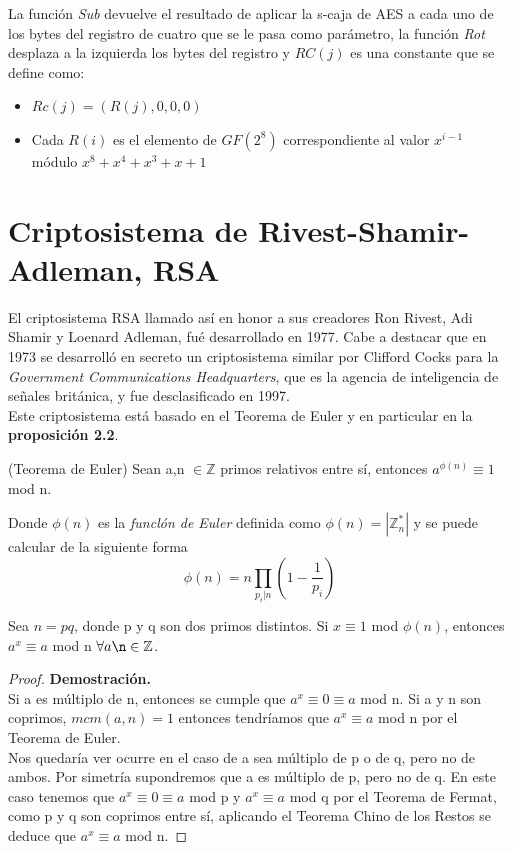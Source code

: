 La función \emph{Sub} devuelve el resultado de aplicar la s-caja de AES a cada uno de los bytes del registro de cuatro que se le pasa como parámetro, la función \emph{Rot} desplaza a la izquierda los bytes del registro y $RC(j)$ es una constante que se define como:
\begin{itemize}
	\item $Rc(j)=(R(j),0,0,0)$
	\item Cada $R(i)$ es el elemento de $GF(2^8)$ correspondiente al valor $x^{i-1}$ módulo $x^8+x^4+x^3+x+1$
\end{itemize}

\section{Criptosistema de Rivest-Shamir-Adleman, RSA}
El criptosistema RSA llamado así en honor a sus creadores Ron Rivest, Adi Shamir y Loenard Adleman, fué desarrollado en 1977. Cabe a destacar que en 1973 se desarrolló en secreto un criptosistema similar por Clifford Cocks para la \emph{Government Communications Headquarters}, que es la agencia de inteligencia de señales británica, y fue desclasificado en 1997\cite{cliffordCocks}.\\
Este criptosistema está basado en el Teorema de Euler y en particular en la \textbf{proposición 2.2}.
\begin{teorema}
	(Teorema de Euler) Sean a,n $\in \mathbb{Z}$ primos relativos entre sí, entonces $a^{\phi(n)}\equiv 1$ mod n.
\end{teorema}
Donde $\phi(n)$ es la \emph{funclón de Euler} definida como $\phi(n)=|\mathbb{Z}^*_n|$ y se puede calcular de la siguiente forma $$\phi(n)=n\prod_{p_i|n}(1-\frac{1}{p_i})$$


\begin{proposicion}
	Sea $n = pq$, donde p y q son dos primos distintos. Si $x\equiv 1$ mod $\phi(n)$, entonces $a^x\equiv a$ mod n $\forall a \n \in \mathbb{Z}$.\\
	\begin{proof}
		\textbf{Demostración.}\\
		Si a es múltiplo de n, entonces se cumple que $a^x \equiv 0 \equiv a$ mod n. Si a y n son coprimos, $mcm(a,n) = 1$ entonces tendríamos que $a^x \equiv a$ mod n por el Teorema de Euler.\\
		Nos quedaría ver ocurre en el caso de a sea múltiplo de p o de q, pero no de ambos. Por simetría supondremos que a es múltiplo de p, pero no de q. En este caso tenemos que $a^x \equiv 0 \equiv a$ mod p  y $a^x \equiv a$ mod q por el Teorema de Fermat, como p y q son coprimos entre sí, aplicando el Teorema Chino de los Restos se deduce que $a^x \equiv a$ mod n. \blacksquare
	\end{proof}
\end{proposicion}

